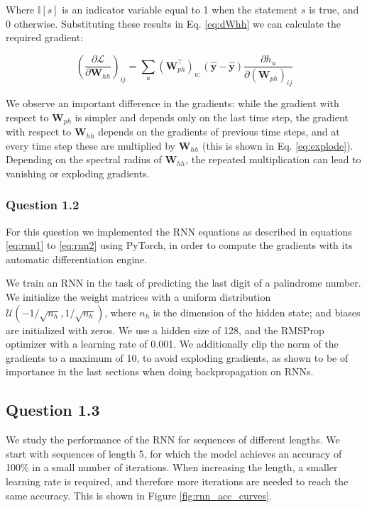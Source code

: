 \documentclass{article}
\newcommand{\pd}[2]{\frac{\partial #1}{\partial #2}}
\begin{document}
Where $\mathbb{I}[s]$ is an indicator variable equal to 1 when the statement $s$ is true, and 0 otherwise. Substituting these results in Eq. \ref{eq:dWhh} we can calculate the required gradient:

\begin{equation}
\left(\pd{\mathcal{L}}{\mathbf{W}_{hh}}\right)_{ij} = \sum_u(\mathbf{W}_{ph}^\top)_{u:}(\hat{\mathbf{y}} - \hat{\mathbf{y}})\pd{h_u}{(\mathbf{W}_{ph})_{ij}}
\end{equation}

We observe an important difference in the gradients: while the gradient with respect to $\mathbf{W}_{ph}$ is simpler and depends only on the last time step, the gradient with respect to $\mathbf{W}_{hh}$ depends on the gradients of previous time steps, and at every time step these are multiplied by $\mathbf{W}_{hh}$ (this is shown in Eq. \ref{eq:explode}). Depending on the spectral radius of $\mathbf{W}_{hh}$, the repeated multiplication can lead to vanishing or exploding gradients.

\subsubsection*{Question 1.2}

For this question we implemented the RNN equations as described in equations \ref{eq:rnn1} to \ref{eq:rnn2} using PyTorch, in order to compute the gradients with its automatic differentiation engine. 

We train an RNN in the task of predicting the last digit of a palindrome number. We initialize the weight matrices with a uniform distribution $\mathcal{U}(-1/\sqrt{n_h}, 1/\sqrt{n_h})$, where $n_h$ is the dimension of the hidden state; and biases are initialized with zeros. We use a hidden size of 128, and the RMSProp optimizer with a learning rate of 0.001. We additionally clip the norm of the gradients to a maximum of 10, to avoid exploding gradients, as shown to be of importance in the last sections when doing backpropagation on RNNs.

\subsection*{Question 1.3}

We study the performance of the RNN for sequences of different lengths. We start with sequences of length 5, for which the model achieves an accuracy of 100\% in a small number of iterations. When increasing the length, a smaller learning rate is required, and therefore more iterations are needed to reach the same accuracy. This is shown in Figure \ref{fig:rnn_acc_curves}.
\end{document}
